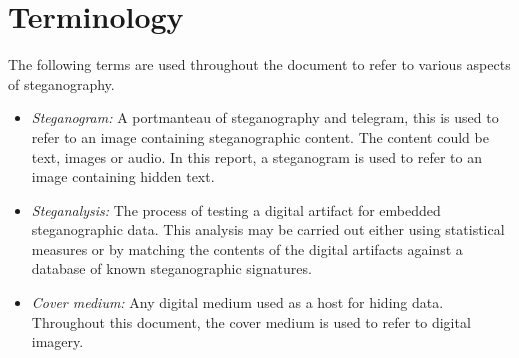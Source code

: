 \section{Terminology}
The following terms are used throughout the document to refer to various aspects of steganography. 
\begin{itemize}
\item{\emph{Steganogram:}} A portmanteau of steganography and telegram, this is used to refer to an image containing steganographic content. The content could be text, images or audio. In this report, a steganogram is used to refer to an image containing hidden text.
\item{\emph{Steganalysis:}} The process of testing a digital artifact for embedded steganographic data. This analysis may be carried out either using statistical measures or by matching the contents of the digital artifacts against a database of known steganographic signatures.
\item{\emph{Cover medium:}} Any digital medium used as a host for hiding data. Throughout this document, the cover medium is used to refer to digital imagery.
\end{itemize}

